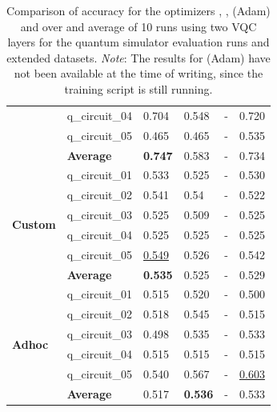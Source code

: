 \begin{table}[!h]
{\begin{tabular}{p{}p{}|p{}p{}p{}p{}}
    		                        & q\_circuit\_04 & 0.704  & 0.548 & -   & 0.720 \\
    		                        & q\_circuit\_05 & 0.465  & 0.465 & -   & 0.535 \\
    		\cline{2-6} 
    		                        & \textbf{Average} & \textbf{0.747}  & 0.583 & -   & 0.734 \\
    		\hline
    		\multirow{6}{*}{\textbf{Custom}} & q\_circuit\_01 & 0.533  & 0.525 & -   & 0.530 \\
    		                        & q\_circuit\_02 & 0.541  & 0.54 & -   & 0.522 \\
    		                        & q\_circuit\_03 & 0.525  & 0.509 & -   & 0.525 \\
    		                        & q\_circuit\_04 & 0.525  & 0.525 & -  & 0.525 \\
    		                        & q\_circuit\_05 & \underline{0.549}  & 0.526 & -   & 0.542 \\
    		\cline{2-6} 
    		                        & \textbf{Average} & \textbf{0.535} & 0.525 & -   & 0.529 \\
    		\hline 
    		\multirow{6}{*}{\textbf{Adhoc}}   & q\_circuit\_01 & 0.515  & 0.520 & -   & 0.500 \\
    		                        & q\_circuit\_02 & 0.518  & 0.545 & -   & 0.515 \\
    		                        & q\_circuit\_03 & 0.498  & 0.535 & -   & 0.533 \\
    		                        & q\_circuit\_04 & 0.515  & 0.515 & -   & 0.515 \\
    		                        & q\_circuit\_05 & 0.540  & 0.567 & -   & \underline{0.603} \\
    		\cline{2-6} 
    		                        & \textbf{Average} & 0.517  & \textbf{0.536} & -   & 0.533 \\
    		\hline 
    	\end{tabular}
	}
	\caption{Comparison of accuracy for the optimizers , ,  (Adam) and  over and average of 10 runs using two VQC layers for the quantum simulator evaluation runs and extended datasets. \textit{Note}: The results for  (Adam) have not been available at the time of writing, since the training script is still running.}
	\label{table:accuracy_comparison_extended_dataset_and_optimizers_simulator_runs}
\end{table}

